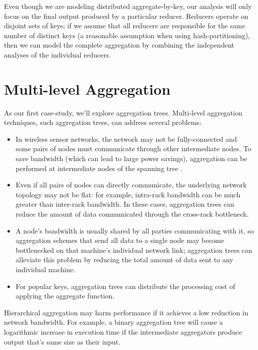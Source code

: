 \documentclass[12pt]{article}
\begin{document}
Even though we are modeling distributed aggregate-by-key, our analysis will
only focus on the final output produced by a particular reducer.  Reducers
operate on disjoint sets of keys; if we assume that all reducers are
responsible for the same number of distinct keys (a reasonable assumption when
using hash-partitioning), then we can model the complete aggregation
by combining the independent analyses of the individual reducers.

\section{Multi-level Aggregation}

As our first case-study, we'll explore aggregation trees.
Multi-level aggregation techniques, such aggregation trees, can address
several problems:

\begin{itemize}
    \item In wireless sensor networks, the network may not be fully-connected
    and some pairs of nodes must communicate through other intermediate nodes.
    To save bandwidth (which can lead to large power savings), aggregation can
    be performed at intermediate nodes of the spanning tree \cite{tag}.

    \item Even if all pairs of nodes can directly communicate, the underlying
    network topology may not be flat: for example, intra-rack bandwidth can be
    much greater than inter-rack bandwidth.  In these cases, aggregation trees
    can reduce the amount of data communicated through the cross-rack
    bottleneck.

    \item A node's bandwidth is usually shared by all parties communicating
    with it, so aggregation schemes that send all data to a single node may
    become bottlenecked on that machine's individual network link; aggregation
    trees can alleviate this problem by reducing the total amount of data sent
    to any individual machine.

    \item For popular keys, aggregation trees can distribute the processing
    cost of applying the aggregate function.

\end{itemize}

Hierarchical aggregation may harm performance if it achieves a low reduction
in network bandwidth. For example, a binary aggregation tree will cause
a logarithmic increase in execution time if the intermediate aggregators
produce output that's same size as their input.
\end{document}
